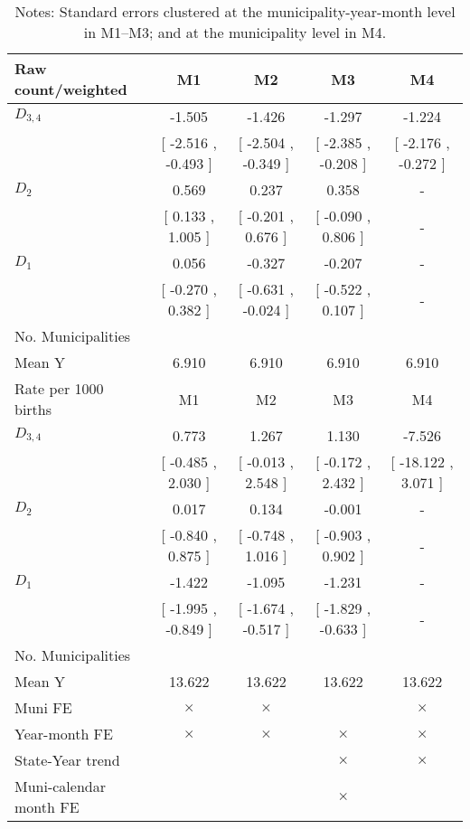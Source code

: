 \begin{table}[!ht]
\centering
\caption{Effects of Drought on apgar_l7}\label{tab:twfe_apgar_l7}
\fontsize{10pt}{12pt}\selectfont
\begin{tabular}{lcccc}
\toprule
  Raw count/weighted &\multicolumn{1}{c}{M1}&\multicolumn{1}{c}{M2}&\multicolumn{1}{c}{M3}&\multicolumn{1}{c}{M4} \\
\midrule
 $ D_{3,4} $ &    -1.505 &    -1.426 &    -1.297 &    -1.224 \\ 
 & [    -2.516 ,    -0.493 ] & [    -2.504 ,    -0.349 ] & [    -2.385 ,    -0.208 ] & [    -2.176 ,    -0.272 ] \\ 
\addlinespace
 $ D_2 $ &     0.569 &     0.237 &     0.358 & - \\ 
 & [     0.133 ,     1.005 ] & [    -0.201 ,     0.676 ] & [    -0.090 ,     0.806 ] & - \\ 
\addlinespace
 $ D_1 $ &     0.056 &    -0.327 &    -0.207 & - \\ 
 & [    -0.270 ,     0.382 ] & [    -0.631 ,    -0.024 ] & [    -0.522 ,     0.107 ] & - \\ 
\addlinespace
\midrule
  No. Municipalities &  &  &  &   \\
  Mean Y &     6.910 &     6.910 &     6.910 &     6.910  \\
\addlinespace
\midrule
  Rate per 1000 births &\multicolumn{1}{c}{M1}&\multicolumn{1}{c}{M2}&\multicolumn{1}{c}{M3}&\multicolumn{1}{c}{M4} \\
\midrule
 $ D_{3,4} $ &     0.773 &     1.267 &     1.130 &    -7.526 \\ 
 & [    -0.485 ,     2.030 ] & [    -0.013 ,     2.548 ] & [    -0.172 ,     2.432 ] & [   -18.122 ,     3.071 ] \\ 
\addlinespace
 $ D_2 $ &     0.017 &     0.134 &    -0.001 & - \\ 
 & [    -0.840 ,     0.875 ] & [    -0.748 ,     1.016 ] & [    -0.903 ,     0.902 ] & - \\ 
\addlinespace
 $ D_1 $ &    -1.422 &    -1.095 &    -1.231 & - \\ 
 & [    -1.995 ,    -0.849 ] & [    -1.674 ,    -0.517 ] & [    -1.829 ,    -0.633 ] & - \\ 
\midrule
  No. Municipalities &  &  &  &   \\
  Mean Y &    13.622 &    13.622 &    13.622 &    13.622  \\
  Muni FE & $ \times $ & $ \times $ &  & $ \times $  \\
  Year-month FE & $ \times $ & $ \times $ & $ \times $ & $ \times $ \\
  State-Year trend &  &  & $ \times $ & $ \times $ \\
  Muni-calendar month FE &  &  & $ \times $ & \\
\bottomrule
\end{tabular}
\caption*{\footnotesize{Notes: Standard errors clustered at the municipality-year-month level in M1--M3; and at the municipality level in M4.}}
\end{table}
